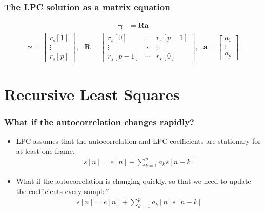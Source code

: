 \documentclass{beamer}
\begin{document}
\begin{frame}
  \frametitle{The LPC solution as a matrix equation}

  \begin{align*}
    \boldsymbol{\gamma} &= \mathbf{R}\mathbf{a}
  \end{align*}
  \begin{align*}
    \boldsymbol{\gamma}=\left[\begin{array}{c}r_s[1]\\\vdots\\r_s[p]\end{array}\right],~~~
    \mathbf{R}=\left[\begin{array}{ccc}r_s[0]&\cdots&r_s[p-1]\\
        \vdots&\ddots&\vdots\\r_s[p-1]&\cdots&r_s[0]\end{array}\right],~~~
    \mathbf{a}=\left[\begin{array}{c}a_1\\\vdots\\a_p\end{array}\right]
  \end{align*}
\end{frame}
    
\section[RLS]{Recursive Least Squares}

\begin{frame}
  \frametitle{What if the autocorrelation changes rapidly?}

  \begin{itemize}
  \item LPC assumes that the autocorrelation and LPC coefficients are
    stationary for at least one frame.
    \begin{align*}
      s[n] = e[n]+\sum_{k=1}^p a_k s[n-k]
    \end{align*}
  \item What if the autocorrelation is changing quickly, so that we
    need to update the coefficients every sample?
    \begin{align*}
      s[n] = e[n]+\sum_{k=1}^p a_k[n] s[n-k]
    \end{align*}
  \end{itemize}
\end{frame}
\end{document}
